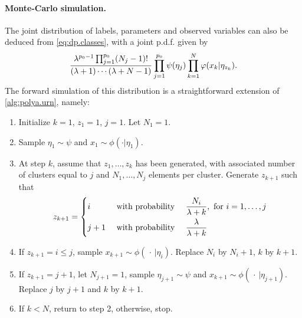 \paragraph{Monte-Carlo simulation.}
The joint distribution of labels, parameters and observed variables can also be deduced from \cref{eq:dp.classes}, with a joint p.d.f. given by
\begin{equation}
\label{eq:dp.mix}
\frac{\lambda^{p_0-1} \prod_{j=1}^{p_0} (N_j-1)!}{(\lambda+1) \cdots (\lambda+N-1)} \prod_{j=1}^{p_0} \psi(\eta_j) \prod_{k=1}^N \varphi(x_k|\eta_{z_k}).
\end{equation}
The forward simulation of this distribution is a straightforward extension of \cref{alg:polya.urn}, namely:
\begin{algorithm}
\label{alg:polya.urn.complete}
\begin{enumerate}[label=\arabic*, wide=0.5cm]
\item Initialize $k=1$, $z_1=1$, $j=1$. Let $N_1 = 1$.
\item Sample $\eta_1\sim \psi$ and $x_1 \sim \phi(\cdot|\eta_1)$.
\item At step $k$, assume that $z_1, \ldots,  z_k$ has been generated, with associated number of clusters equal to $j$ and $N_1, \dots, N_j$ elements per cluster. Generate $z_{k+1}$ such that
\[
z_{k+1} = 
\left\{
\begin{aligned}
&i&& \text{ with probability } && \frac{N_i}{\lambda + k}, \text{ for } i=1, \ldots, j\\
&j+1&& \text{ with probability } && \frac{\lambda}{\lambda + k}
\end{aligned}
\right.
\]
\item If $z_{k+1} = i \leq j$, sample $x_{k+1} \sim \phi(\,\cdot\, | \eta_i)$. Replace $N_i$ by $N_{i}+1$, $k$ by $k+1$.
\item If $z_{k+1} = j+1$, let $N_{j+1} = 1$, sample $\eta_{j+1} \sim \psi$ and $x_{k+1} \sim \phi(\,\cdot\, | \eta_{j+1})$. Replace $j$ by $j+1$ and $k$ by $k+1$.
\item If $k<N$, return to step 2, otherwise, stop.
\end{enumerate}
\end{algorithm}

